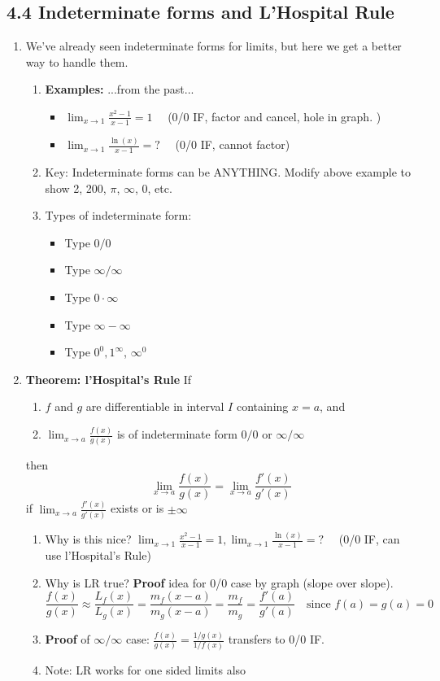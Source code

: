 \documentclass{article}
\newcommand{\ds}{\displaystyle}
\begin{document}
\subsection{4.4 Indeterminate forms and L'Hospital Rule}

\begin{enumerate}
\item We've already seen indeterminate forms for limits, but here we get a better way to handle them.
\begin{enumerate}
\item {\bf Examples:} ...from the past...
\begin{itemize}
\item $\ds \lim_{x\rightarrow 1} \frac{x^2-1}{x-1}=1 \quad$ (0/0 IF, factor and cancel, hole in graph. )
\item $\ds \lim_{x\rightarrow 1} \frac{\ln(x)}{x-1}=? \quad$ (0/0 IF, cannot factor)
\end{itemize}
\item Key: Indeterminate forms can be ANYTHING. Modify above example to show 2, 200, $\pi$, $\infty$, 0, etc.
\item Types of indeterminate form:
\begin{itemize}
\item Type $0/0$
\item Type $\infty/\infty$
\item Type $0\cdot \infty$
\item Type $\infty-\infty$
\item Type $0^0, 1^\infty$, $\infty^0$
\end{itemize}
\end{enumerate}

\item {\bf Theorem: l'Hospital's Rule} If
\begin{enumerate}
\item $f$ and $g$ are differentiable in interval $I$ containing $x=a$, and
\item $\displaystyle\lim_{x\rightarrow a} \frac{f(x)}{g(x)}$ is of indeterminate form $0/0$ or $\infty/\infty$
\end{enumerate}
then
$$
\lim_{x\rightarrow a} \frac{f(x)}{g(x)} = \lim_{x\rightarrow a} \frac{f'(x)}{g'(x)}
$$
if $\displaystyle\lim_{x\rightarrow a} \frac{f'(x)}{g'(x)}$ exists or is $\pm\infty$

\begin{enumerate}
\item Why is this nice? $\ds \lim_{x\rightarrow 1} \frac{x^2-1}{x-1}=1, \lim_{x\rightarrow 1} \frac{\ln(x)}{x-1}=? \quad$ (0/0 IF, can use l'Hospital's Rule)
\item Why is LR true? {\bf Proof} idea for 0/0 case by graph (slope over slope).
\[
\frac{f(x)}{g(x)} \approx \frac{L_f(x)}{L_g(x)} = \frac{m_f(x-a)}{m_g(x-a)} = \frac{m_f}{m_g} = \frac{f'(a)}{g'(a)} \quad \text{since } f(a)=g(a)=0
\]
\item {\bf Proof} of $\infty/\infty$ case: $\frac{f(x)}{g(x)} = \frac{1/g(x)}{1/f(x)}$ transfers to 0/0 IF.
\item Note: LR works for one sided limits also
\end{enumerate}


\end{enumerate}
\end{document}
